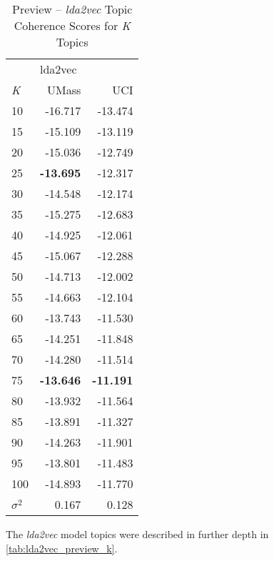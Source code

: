 \documentclass[letterpaper,12pt]{article}
\begin{document}
\begin{table}
	\caption{\label{tab:lda2vec_preview_tc} Preview -- \emph{lda2vec} Topic Coherence Scores for \emph{K} Topics}
	\begin{center}
		\begin{tabular}{lrr}
			\toprule
			{} & \multicolumn{2}{l}{lda2vec} \\
			\emph{K} &   UMass &     UCI \\
			\midrule
			10  & -16.717 & -13.474 \\
			15  & -15.109 & -13.119 \\
			20  & -15.036 & -12.749 \\
			25  & \textbf{-13.695} & -12.317 \\
			30  & -14.548 & -12.174 \\
			35  & -15.275 & -12.683 \\
			40  & -14.925 & -12.061 \\
			45  & -15.067 & -12.288 \\
			50  & -14.713 & -12.002 \\
			55  & -14.663 & -12.104 \\
			60  & -13.743 & -11.530 \\
			65  & -14.251 & -11.848 \\
			70  & -14.280 & -11.514 \\
			75  & \textbf{-13.646} & \textbf{-11.191} \\
			80  & -13.932 & -11.564 \\
			85  & -13.891 & -11.327 \\
			90  & -14.263 & -11.901 \\
			95  & -13.801 & -11.483 \\
			100 & -14.893 & -11.770 \\
			\midrule
			$\sigma^2$ & 0.167 & 0.128 \\
			\bottomrule
			\end{tabular}
	\end{center}
\end{table}



The \emph{lda2vec} model topics were described in further depth in \ref{tab:lda2vec_preview_k}.
\end{document}
